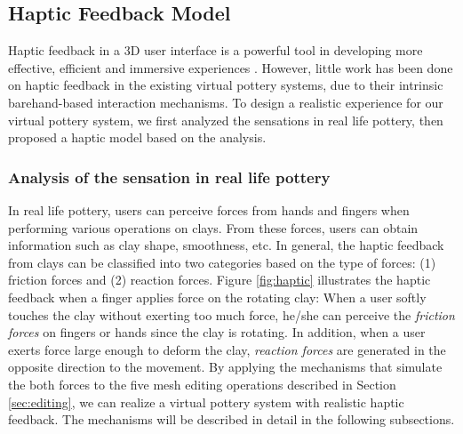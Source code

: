 \documentclass{svjour3}                     %
\begin{document}
\subsection{Haptic Feedback Model}
\label{sec:haptic}

Haptic feedback in a 3D user interface is a powerful tool in developing more effective, efficient and immersive experiences \cite{laviola20173d}.
However, little work has been done on haptic feedback in the existing virtual pottery systems, due to their intrinsic barehand-based interaction mechanisms.
To design a realistic experience for our virtual pottery system, we first analyzed the sensations in real life pottery, then proposed a haptic model based on the analysis.


\subsubsection{Analysis of the sensation in real life pottery}

In real life pottery, users can perceive forces from hands and fingers when performing various operations on clays.
From these forces, users can obtain information such as clay shape, smoothness, etc.
In general, the haptic feedback from clays can be classified into two categories based on the type of forces: (1) friction forces and (2) reaction forces.
%
{\color{blue}
Figure \ref{fig:haptic} illustrates the haptic feedback when a finger applies force on the rotating clay:
}
%
When a user softly touches the clay without exerting too much force, he/she can perceive the \textit{friction forces} on fingers or hands since the clay is rotating.
In addition, when a user exerts force large enough to deform the clay, \textit{reaction forces} are generated in the opposite direction to the movement.
By applying the mechanisms that simulate the both forces to the five mesh editing operations described in Section \ref{sec:editing}, we can realize a virtual pottery system with realistic haptic feedback.
The mechanisms will be described in detail in the following subsections.
\end{document}
